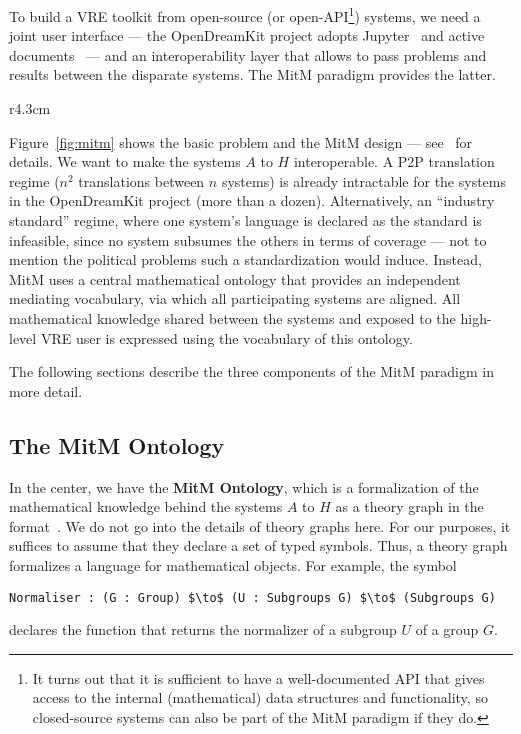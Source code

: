 To build a VRE toolkit from open-source (or open-API\footnote{It turns out that it is
  sufficient to have a well-documented API that gives access to the internal
  (mathematical) data structures and functionality, so closed-source systems can also be
  part of the MitM paradigm if they do.}) systems, we need a joint user interface --- the
OpenDreamKit project adopts Jupyter~\cite{jupyter-project:on} and active
documents~\cite{KohDavGin:psewads11} --- and an interoperability layer that allows to pass
problems and results between the disparate systems. 
The MitM paradigm provides the latter.

\begin{wrapfigure}r{4.3cm}\vspace*{-2em}
  \vspace*{-1em}
  \caption{MitM Paradigm}\label{fig:mitm}\vspace*{-1.5em}
\end{wrapfigure}
Figure~\ref{fig:mitm} shows the basic problem and the MitM design --- see~\cite{DehKohKon:iop16} for details.
We want to make the systems $A$ to $H$ interoperable.
A P2P translation regime ($n^2$ translations between $n$ systems) is already intractable for the systems in the OpenDreamKit project (more than a dozen).
Alternatively, an ``industry standard'' regime, where one system's language is declared as the standard is infeasible, since no system subsumes the others in terms of coverage --- not to mention the political problems such a standardization would induce.
Instead, MitM uses a central mathematical ontology that provides an independent mediating vocabulary, via which all participating systems are aligned.
All mathematical knowledge shared between the systems and exposed to the high-level VRE user is expressed using the vocabulary of this ontology.

The following sections describe the three components of the MitM paradigm in more detail.

\subsection{The MitM Ontology}\label{sec:mitm:recap}

In the center, we have the \textbf{MitM Ontology}, which is a formalization of
the mathematical knowledge behind the systems $A$ to $H$ as a theory graph in
the \OMMT format~\cite{Kohlhase:OMDoc1.2,RabKoh:WSMSML13,uniformal:on}. We do
not go into the details of \OMMT theory graphs here. For our purposes, it
suffices to assume that they declare a set of typed symbols. Thus, a theory
graph formalizes a language for mathematical objects.
For example, the symbol
\begin{lstlisting}[mathescape]
Normaliser : (G : Group) $\to$ (U : Subgroups G) $\to$ (Subgroups G)
\end{lstlisting} 
declares the function that returns the normalizer of a subgroup $U$ of a group $G$.


